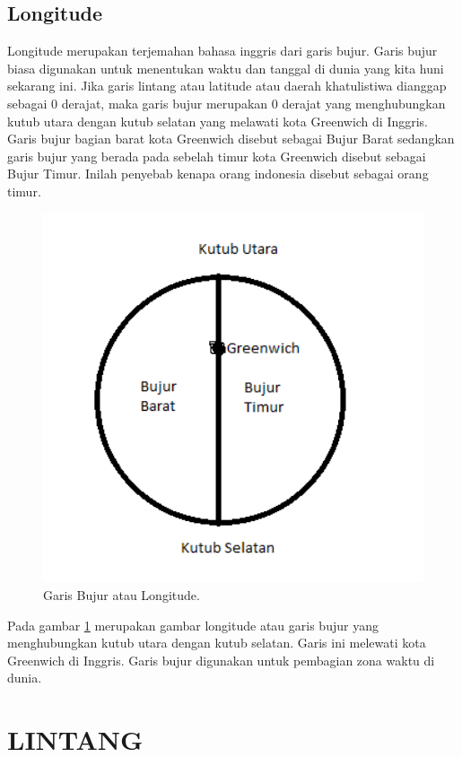 \subsection{Longitude}
Longitude merupakan terjemahan bahasa inggris dari garis bujur. Garis bujur biasa digunakan untuk menentukan waktu dan tanggal di dunia yang kita huni sekarang ini. Jika garis lintang atau latitude atau daerah khatulistiwa dianggap sebagai 0 derajat, maka garis bujur merupakan 0 derajat yang menghubungkan kutub utara dengan kutub selatan yang melawati kota Greenwich di Inggris. Garis bujur bagian barat kota Greenwich disebut sebagai Bujur Barat sedangkan garis bujur yang berada pada sebelah timur kota Greenwich disebut sebagai Bujur Timur. Inilah penyebab kenapa orang indonesia disebut sebagai orang timur.
	\begin{figure}[ht]
	\centerline{\includegraphics[width=1\textwidth]{figures/longitude.PNG}}
	\caption{Garis Bujur atau Longitude.}
	\label{longitude}
	\end{figure}
Pada gambar \ref{longitude} merupakan gambar longitude atau garis bujur yang menghubungkan kutub utara dengan kutub selatan. Garis ini melewati kota Greenwich di Inggris.
Garis bujur digunakan untuk pembagian zona waktu di dunia.

\section{LINTANG}

